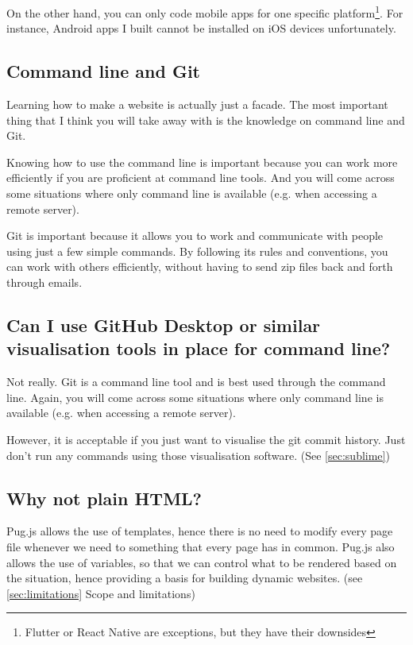 On the other hand, you can only code mobile apps for one specific platform\footnote{Flutter or React Native are exceptions, but they have their downsides}. For instance, Android apps I built cannot be installed on iOS devices unfortunately.

\subsection*{Command line and Git}

Learning how to make a website is actually just a facade. The most important thing that I think you will take away with is the knowledge on command line and Git.

Knowing how to use the command line is important because you can work more efficiently if you are proficient at command line tools. And you will come across some situations where only command line is available (e.g. when accessing a remote server). 

Git is important because it allows you to work and communicate with people using just a few simple commands. By following its rules and conventions, you can work with others efficiently, without having to send zip files back and forth through emails. 

\subsection*{Can I use GitHub Desktop or similar visualisation tools in place for command line?}
\label{sec:githubdesktop}
Not really. Git is a command line tool and is best used through the command line. Again, you will come across some situations where only command line is available (e.g. when accessing a remote server). 

However, it is acceptable if you just want to visualise the git commit history. Just don't run any commands using those visualisation software. (See \cref{sec:sublime})

\subsection*{Why not plain HTML?}

Pug.js allows the use of templates, hence there is no need to modify every page file whenever we need to something that every page has in common. Pug.js also allows the use of variables, so that we can control what to be rendered based on the situation, hence providing a basis for building dynamic websites. (see \cref{sec:limitations} Scope and limitations)

